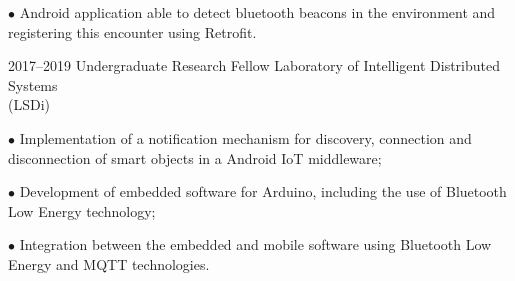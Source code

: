 \documentclass[]{../document-class/twentysecondcv}
\begin{document}
\begin{twenty}
{			$\bullet$ Android application able to detect bluetooth beacons in the environment and registering this encounter using Retrofit.
		}

	\twentyitem
		{2017--2019}
		{Undergraduate Research Fellow}
		{Laboratory of Intelligent Distributed Systems \\\hspace*{\fill}(LSDi)}
		{
			$\bullet$ Implementation of a notification mechanism for discovery, connection and disconnection of smart objects in a Android IoT middleware;\vskip 4pt 

			$\bullet$ Development of embedded software for Arduino, including the use of Bluetooth Low Energy technology;\vskip 4pt 

			$\bullet$ Integration between the embedded and mobile software using Bluetooth Low Energy and MQTT technologies.
		}
\end{twenty}
\end{document}
